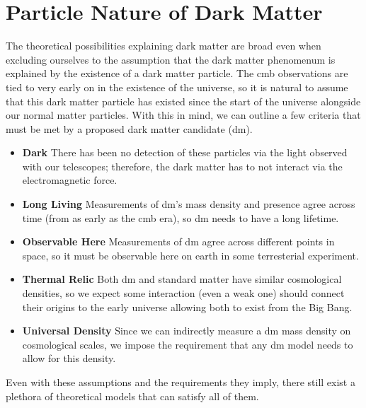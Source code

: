 \section{Particle Nature of Dark Matter}
The theoretical possibilities explaining dark matter are broad \cite{darksectors-2016} even when
excluding ourselves to the assumption that the dark matter phenomenum is explained by the existence
of a dark matter particle. The \ac{cmb} observations are tied to very early on in the existence
of the universe, so it is natural to assume that this dark matter particle has existed since the
start of the universe alongside our normal matter particles. With this in mind, we can outline
a few criteria that must be met by a proposed dark matter candidate (\ac{dm}).
\begin{itemize}
  \item \textbf{Dark} There has been no detection of these particles via the light observed with our telescopes;
        therefore, the dark matter has to not interact via the electromagnetic force.
  \item \textbf{Long Living} Measurements of \ac{dm}'s mass density and presence agree across time
        (from as early as the \ac{cmb} era), so \ac{dm} needs to have a long lifetime.
  \item \textbf{Observable Here} Measurements of \ac{dm} agree across different points in space,
        so it must be observable here on earth in some terresterial experiment.
  \item \textbf{Thermal Relic} Both \ac{dm} and standard matter have similar
        cosmological densities, so we expect some interaction (even a weak one) should connect their
        origins to the early universe allowing both to exist from the Big Bang.
  \item \textbf{Universal Density} Since we can indirectly measure a \ac{dm} mass density on
        cosmological scales, we impose the requirement that any \ac{dm} model needs to allow for
        this density.
\end{itemize}
Even with these assumptions and the requirements they imply, there still exist a plethora of
theoretical models that can satisfy all of them.

